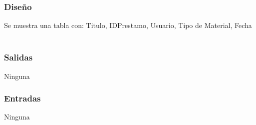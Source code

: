 \subsubsection{Diseño}
	Se muestra una tabla con: Titulo, IDPrestamo, Usuario, Tipo de Material, Fecha  \\\\


\subsubsection{Salidas}
	\begin{Citemize}
		\item Ninguna
	\end{Citemize}
	
\subsubsection{Entradas}
	\begin{Citemize}
		\item Ninguna
	\end{Citemize}